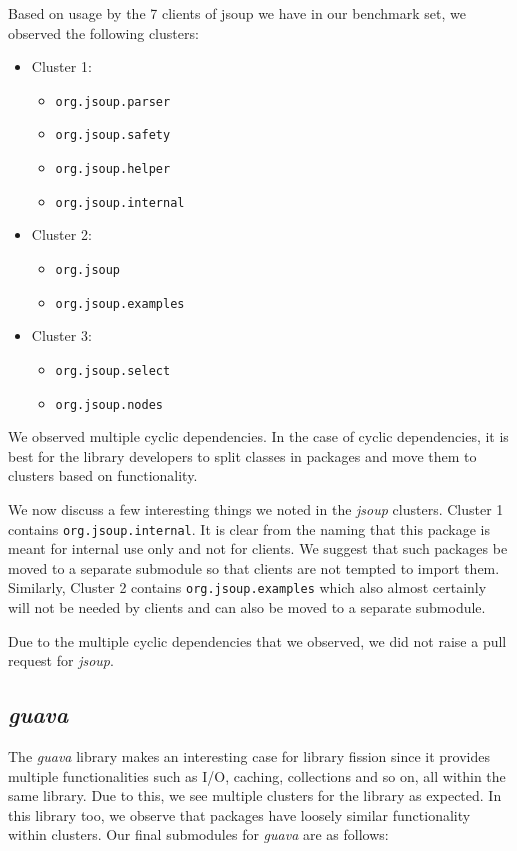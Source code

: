 Based on usage by the 7 clients of jsoup we have in our benchmark set, we observed the following clusters:
\begin{itemize}
\item Cluster 1:
\begin{itemize}
\item \texttt{org.jsoup.parser}
\item \texttt{org.jsoup.safety}
\item \texttt{org.jsoup.helper}
\item \texttt{org.jsoup.internal}
\end{itemize}
\item Cluster 2:
\begin{itemize}
\item \texttt{org.jsoup}
\item \texttt{org.jsoup.examples}
\end{itemize}
\item Cluster 3:
\begin{itemize}
\item \texttt{org.jsoup.select}
\item \texttt{org.jsoup.nodes}
\end{itemize}
\end{itemize}

We observed multiple cyclic dependencies. In the case of cyclic dependencies, it is best for the library developers to split classes in packages and move them to clusters based on functionality. 

We now discuss a few interesting things we noted in the \emph{jsoup} clusters. Cluster 1 contains \texttt{org.jsoup.internal}. It is clear from the naming that this package is meant for internal use only and not for clients. We suggest that such packages be moved to a separate submodule so that clients are not tempted to import them. Similarly, Cluster 2 contains \texttt{org.jsoup.examples} which also almost certainly will not be needed by clients and can also be moved to a separate submodule. 

Due to the multiple cyclic dependencies that we observed, we did not raise a pull request for \emph{jsoup}.

\subsection{\emph{guava}}
\label{sec:guava-fission}

The \emph{guava} library makes an interesting case for library fission since it provides multiple functionalities such as I/O, caching, collections and so on, all within the same library. Due to this, we see multiple clusters for the library as expected. In this library too, we observe that packages have loosely similar functionality within clusters. Our final submodules for \emph{guava} are as follows:

